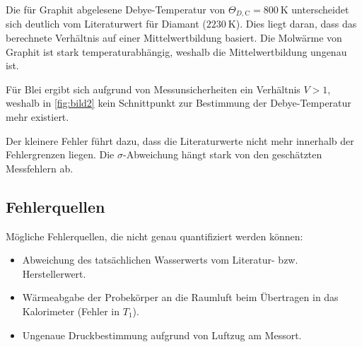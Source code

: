 Die für Graphit abgelesene Debye-Temperatur von \(\Theta_{D,\text{C}} = \qty{800}{\K}\) unterscheidet sich deutlich vom Literaturwert für Diamant (\(\qty{2230}{\K}\)). Dies liegt daran, dass das berechnete Verhältnis auf einer Mittelwertbildung basiert. Die Molwärme von Graphit ist stark temperaturabhängig, weshalb die Mittelwertbildung ungenau ist.

Für Blei ergibt sich aufgrund von Messunsicherheiten ein Verhältnis \(V > 1\), weshalb in \cref{fig:bild2} kein Schnittpunkt zur Bestimmung der Debye-Temperatur mehr existiert. 

Der kleinere Fehler führt dazu, dass die Literaturwerte nicht mehr innerhalb der Fehlergrenzen liegen. Die \(\sigma\)-Abweichung hängt stark von den geschätzten Messfehlern ab.

\subsection{Fehlerquellen}
Mögliche Fehlerquellen, die nicht genau quantifiziert werden können:
\begin{itemize}
    \item Abweichung des tatsächlichen Wasserwerts vom Literatur- bzw. Herstellerwert.
    \item Wärmeabgabe der Probekörper an die Raumluft beim Übertragen in das Kalorimeter (Fehler in \(T_1\)).
    \item Ungenaue Druckbestimmung aufgrund von Luftzug am Messort.
\end{itemize}